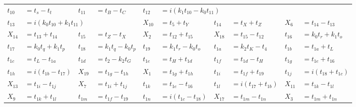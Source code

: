 \begin{tabular}{|p{4.3pt}l|p{4.3pt}l|p{4.3pt}l|p{4.3pt}l|p{4.3pt}l|}
$t_{10} $ &$= t_s - t_t$ & $t_{11} $ &$= t_B - t_C$ & $t_{12} $ &\multicolumn{5}{l|}{$= i(k_1t_{10} - k_0t_{11})$}\\ 
$t_{13} $ &\multicolumn{3}{l|}{$= i(k_0t_{10} + k_1t_{11})$} & $X_{10} $ &$= t_5 + t_Y$ & $t_{14} $ &$= t_X + t_Z$ & $X_6 $ &$= t_{14} - t_{13}$\\ 
$X_{14} $ &$= t_{13} + t_{14}$ & $t_{15} $ &$= t_Z - t_X$ & $X_2 $ &$= t_{12} + t_{15}$ & $X_{18} $ &$= t_{15} - t_{12}$ & $t_{16} $ &$= k_0t_r + k_1t_o$\\ 
$t_{17} $ &$= k_0t_q + k_1t_p$ & $t_{18} $ &$= k_1t_q - k_0t_p$ & $t_{19} $ &$= k_1t_r - k_0t_o$ & $t_{1a} $ &$= k_2t_K - t_4$ & $t_{1b} $ &$= t_{1a} + t_L$\\ 
$t_{1c} $ &$= t_L - t_{1a}$ & $t_{1d} $ &$= t_2 - k_2t_G$ & $t_{1e} $ &$= t_H + t_{1d}$ & $t_{1f} $ &$= t_{1d} - t_H$ & $t_{1g} $ &$= t_{1e} + t_{16}$\\ 
$t_{1h} $ &$= i(t_{1b} - t_{17})$ & $X_{19} $ &$= t_{1g} - t_{1h}$ & $X_1 $ &$= t_{1g} + t_{1h}$ & $t_{1i} $ &$= t_{1f} + t_{19}$ & $t_{1j} $ &$= i(t_{18} + t_{1c})$\\ 
$X_{13} $ &$= t_{1i} - t_{1j}$ & $X_7 $ &$= t_{1i} + t_{1j}$ & $t_{1k} $ &$= t_{1e} - t_{16}$ & $t_{1l} $ &$= i(t_{17} + t_{1b})$ & $X_{11} $ &$= t_{1k} - t_{1l}$\\ 
$X_9 $ &$= t_{1k} + t_{1l}$ & $t_{1m} $ &$= t_{1f} - t_{19}$ & $t_{1n} $ &$= i(t_{1c} - t_{18})$ & $X_{17} $ &$= t_{1m} - t_{1n}$ & $X_3 $ &$= t_{1m} + t_{1n}$\\ 
\bottomrule\end{tabular}

